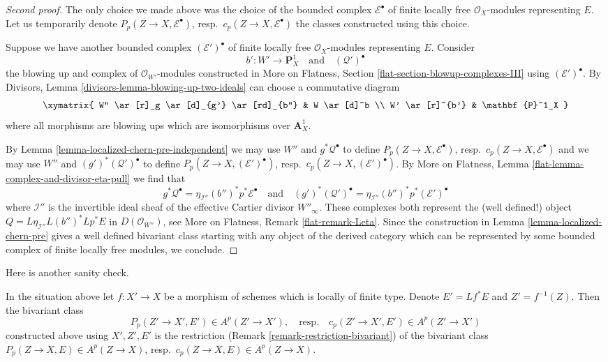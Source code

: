 \begin{proof}[Second proof]
The only choice we made above was the choice of the bounded complex
$\mathcal{E}^\bullet$ of finite locally free $\mathcal{O}_X$-modules
representing $E$. Let us temporarily denote
$P_p(Z \to X, \mathcal{E}^\bullet)$, resp.\ $c_p(Z \to X, \mathcal{E}^\bullet)$
the classes constructed using this choice.

\medskip\noindent
Suppose we have another bounded complex
$(\mathcal{E}')^\bullet$ of finite locally free $\mathcal{O}_X$-modules
representing $E$. Consider
$$
b' : W' \longrightarrow \mathbf{P}^1_X
\quad\text{and}\quad
(\mathcal{Q}')^\bullet
$$
the blowing up and complex of $\mathcal{O}_{W'}$-modules constructed in
More on Flatness, Section \ref{flat-section-blowup-complexes-III}
using $(\mathcal{E}')^\bullet$. By
Divisors, Lemma \ref{divisors-lemma-blowing-up-two-ideals}
can choose a commutative diagram
$$
\xymatrix{
W'' \ar[r]_g \ar[d]_{g'} \ar[rd]_{b''} & W \ar[d]^b \\
W' \ar[r]^{b'} & \mathbf{P}^1_X
}
$$
where all morphisms are blowing ups which are isomorphisms over
$\mathbf{A}^1_X$.

\medskip\noindent
By Lemma \ref{lemma-localized-chern-pre-independent}
we may use $W''$ and $g^*\mathcal{Q}^\bullet$ to define
$P_p(Z \to X, \mathcal{E}^\bullet)$, resp.\ $c_p(Z \to X, \mathcal{E}^\bullet)$
and we may use $W''$ and $(g')^*(\mathcal{Q}')^\bullet$ to define
$P_p(Z \to X, (\mathcal{E}')^\bullet)$,
resp.\ $c_p(Z \to X, (\mathcal{E}')^\bullet)$.
By More on Flatness, Lemma
\ref{flat-lemma-complex-and-divisor-eta-pull}
we find that
$$
g^*\mathcal{Q}^\bullet =
\eta_{\mathcal{I}''}(b'')^*p^*\mathcal{E}^\bullet
\quad\text{and}\quad
(g')^*(\mathcal{Q}')^\bullet =
\eta_{\mathcal{I}''}(b'')^*p^*(\mathcal{E}')^\bullet
$$
where $\mathcal{I}''$ is the invertible ideal sheaf of the effective
Cartier divisor $W''_\infty$.
These complexes both represent the (well defined!) object
$Q = L\eta_{\mathcal{I}''}L(b'')^*Lp^*E$
in $D(\mathcal{O}_{W''})$, see
More on Flatness, Remark \ref{flat-remark-Leta}. Since the construction
in Lemma \ref{lemma-localized-chern-pre} gives a well defined bivariant class
starting with any object of the derived category which can be represented by
some bounded complex of finite locally free modules, we conclude.
\end{proof}

\noindent
Here is another sanity check.

\begin{lemma}
\label{lemma-base-change-loc-chern}
In the situation above let $f : X' \to X$ be a morphism of schemes
which is locally of finite type. Denote $E' = Lf^*E$ and $Z' = f^{-1}(Z)$.
Then the bivariant class
$$
P_p(Z' \to X', E') \in A^p(Z' \to X'),
\quad\text{resp.}\quad
c_p(Z' \to X', E') \in A^p(Z' \to X')
$$
constructed above using $X', Z', E'$ is the restriction
(Remark \ref{remark-restriction-bivariant}) of the
bivariant class $P_p(Z \to X, E) \in A^p(Z \to X)$,
resp.\ $c_p(Z \to X, E) \in A^p(Z \to X)$.
\end{lemma}

